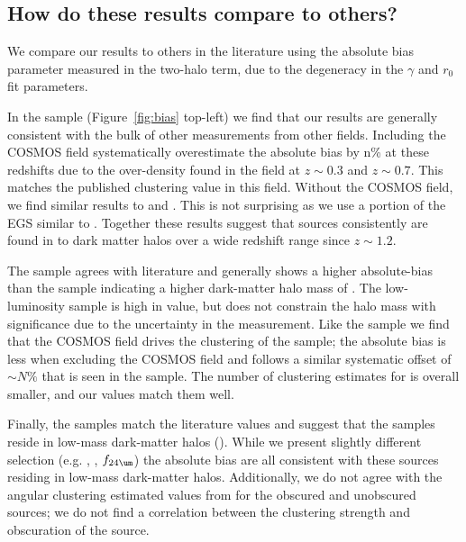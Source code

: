 \subsection{How do these results compare to others?}\label{sec:litdiscussion}
We compare our results to others in the literature using the absolute bias parameter measured in the two-halo term, due to the degeneracy in the $\gamma$ and $r_0$ fit parameters.

In the \Xray sample (Figure~\ref{fig:bias} top-left) we find that our results are generally consistent with the bulk of other measurements from other fields.  
Including the COSMOS field systematically overestimate the absolute bias by n\% at these redshifts due to the over-density found in the field at $z\sim0.3$ and $z\sim0.7$.
This matches the published clustering value in this field.
Without the COSMOS field, we find similar results to \citet{Coil09} and \cite{Hickox09}.
This is not surprising as we use a portion of the EGS similar to \citet{Coil09}.
Together these results suggest that \Xray sources consistently are found in  
 to  dark matter halos over a wide redshift range since $z\sim1.2$.

The \Radio sample agrees with literature and generally shows a higher absolute-bias than the \Xray sample indicating a higher dark-matter halo mass of .
The low-luminosity \Radio sample is high in value, but does not constrain the halo mass with significance due to the uncertainty in the measurement. 
Like the \Xray sample we find that the COSMOS field drives the clustering of the \Radio sample; the absolute bias is less when excluding the COSMOS field and follows a similar systematic offset of $\sim N\%$ that is seen in the \Xray sample.
The number of clustering estimates for \Radio is overall smaller, and our values match them well.

Finally, the \IR samples match the literature values and suggest that the \IR samples reside in low-mass dark-matter halos ().
While we present slightly different selection (e.g. \Donley, \Stern, $f_{24\um}$) the absolute bias are all consistent with these sources residing in low-mass dark-matter halos.
Additionally, we do not agree with the angular clustering estimated values from \citet{Donoso13} for the obscured and unobscured sources; we do not find a correlation between the clustering strength and obscuration of the source.










